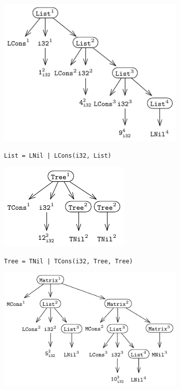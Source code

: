 \begin{figure}[H]
\begin{minipage}[c]{0.45\textwidth}
\begin{subfigure}[b]{1\textwidth}
\begin{center}
{\includegraphics[scale=1]{chapters/figures/figParseTreeList3.pdf}}
\end{center}
\vspace{-15px}
\caption{\label{fig:listParseTree}{\tt List = LNil | \newline LCons(i32, List)}}
\end{subfigure}
\begin{subfigure}[b]{1\textwidth}
\begin{center}
{\includegraphics[scale=1.1]{chapters/figures/figParseTreeTree2.pdf}}
\end{center}
\vspace{-15px}
\caption{\label{fig:treeParseTree}{\tt Tree = TNil | \newline TCons(i32, Tree, Tree)}}
\end{subfigure}%
\end{minipage}%
\begin{minipage}[c]{0.55\textwidth}
\begin{subfigure}[b]{1\textwidth}
\begin{center}
{\includegraphics[scale=1]{chapters/figures/figParseTreeMatrix2.pdf}}

\end{center}
\end{subfigure}
\end{minipage}
\end{figure}
